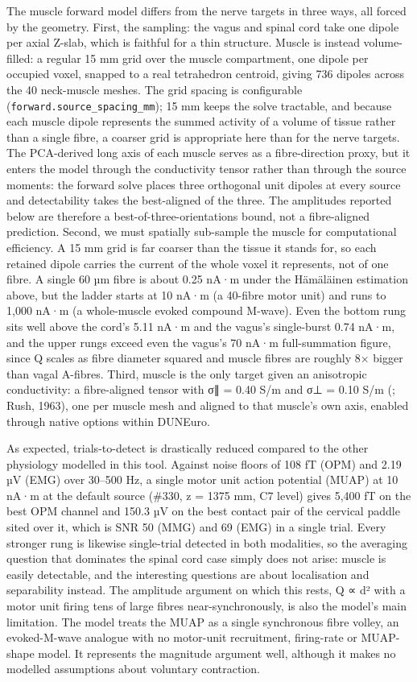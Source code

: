 \documentclass[11pt]{article}
\newcommand{\revised}[1]{#1}
\begin{document}
The muscle forward model differs from the nerve targets in three ways,
all forced by the geometry. First, the sampling: the vagus and spinal
cord take one dipole per axial Z-slab, which is faithful for a thin
structure. Muscle is instead volume-filled: a regular 15 mm grid over
the muscle compartment, one dipole per occupied voxel, snapped to a
real tetrahedron centroid, giving \revised{736} dipoles across the 40 neck-muscle
meshes. The grid spacing is configurable (\texttt{forward.source\_spacing\_mm});
15 mm keeps the solve tractable, and because each muscle dipole
represents the summed activity of a volume of tissue rather than a
single fibre, a coarser grid is appropriate here than for the nerve
targets. The PCA-derived long axis of each muscle serves as a
fibre-direction proxy, but it enters the model through the conductivity
tensor rather than through the source moments: the forward solve places
three orthogonal unit dipoles at every source and detectability takes
the best-aligned of the three. The amplitudes reported below are
therefore a best-of-three-orientations bound, not a fibre-aligned
prediction. Second, we must spatially sub-sample the muscle for
computational efficiency. A 15 mm grid is far coarser than the tissue it
stands for, so each retained dipole carries the current of the whole
voxel it represents, not of one fibre. A single 60 µm fibre is about
0.25 nA·m under the Hämäläinen estimation above, but the ladder starts
at 10 nA·m (a 40-fibre motor unit) and runs to 1,000 nA·m (a whole-muscle
evoked compound M-wave). Even the bottom rung sits well above the
cord's 5.11 nA·m and the vagus's
single-burst 0.74 nA·m, and the upper rungs exceed even the
vagus's 70 nA·m full-summation figure, since Q scales as
fibre diameter squared and muscle fibres are roughly 8× bigger than
vagal A-fibres. Third, muscle is the only target given an anisotropic
conductivity: a fibre-aligned tensor with σ∥ = 0.40 S/m and σ⊥ = 0.10
S/m (\citealp{Gabriel1996}; Rush, 1963), one per muscle mesh and aligned to that
muscle's own axis, enabled through native options within
DUNEuro.

As expected, trials-to-detect is drastically reduced compared to the
other physiology modelled in this tool. Against noise floors of \revised{108 fT}
(OPM) and 2.19 µV (EMG) over 30--500 Hz, a single motor unit action
potential (MUAP) at 10 nA·m \revised{at the default source (\#330, z = 1375 mm, C7
level) gives 5,400 fT} on the best OPM channel and
\revised{150.3 µV} on the best contact pair of the cervical paddle sited over it,
which is SNR \revised{50} (MMG) and \revised{69} (EMG) in a single trial. Every stronger
rung is likewise single-trial detected in both modalities, so the
averaging question that dominates the spinal cord case simply does not
arise: muscle is easily detectable, and the interesting questions are
about localisation and separability instead. The amplitude argument on
which this rests, Q ∝ d² with a motor unit firing tens of large fibres
near-synchronously, is also the model's main limitation.
The model treats the MUAP as a single synchronous fibre volley, an
evoked-M-wave analogue with no motor-unit recruitment, firing-rate or
MUAP-shape model. It represents the magnitude argument well, although it
makes no modelled assumptions about voluntary contraction.
\end{document}
